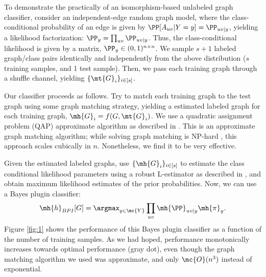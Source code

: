 \documentclass[10pt,journal,cspaper,compsoc]{IEEEtran}
\begin{document}
To demonstrate the practically of an isomorphism-based unlabeled graph classifier, consider an independent-edge random graph model, where the class-conditional probability of an edge is given by $\PP[A_{uv}|Y=y]=\PP_{uv|y}$, yielding a likelihood factorization: $\PP_y=\prod_{uv}\PP_{uv|y}$. Thus, the class-conditional likelihood is given by a matrix, $\PP_y \in (0,1)^{n \times n}$. We sample $s+1$ labeled graph/class pairs identically and independently from the above distribution ($s$ training samples, and 1 test sample). Then, we pass each training graph through a shuffle channel, yielding $\{\mt{G}_i\}_{i \in [s]}$.

Our classifier  proceeds as follows.  Try to match each training graph to the test graph using some graph matching strategy, yielding a estimated labeled graph for each training graph, $\mh{G}_i=f(G,\mt{G}_i)$.  We  use a quadratic assignment problem (QAP) approximate algorithm as described in \cite{VP11QAP}.  This is an approximate graph matching algorithm; while solving graph matching is NP-hard \cite{Conte04}, this approach scales cubically in $n$.  Nonetheless, we find it to be very effective.

Given the estimated labeled graphs, use $\{\mh{G}_i\}_{i \in [s]}$ to estimate the class conditional likelihood parameters using a robust L-estimator as described in \cite{VP11sigsub}, and obtain maximum likelihood estimates of the prior probabilities.  Now, we can use a Bayes plugin classifier:
\begin{align}
	\mh{h}_{BPI}[G]=\argmax_{y\in\mc{Y}} \prod_{uv} \mh{\PP}_{uv|y}\mh{\pi}_y.
\end{align}
Figure \ref{fig:1} shows the performance of this Bayes plugin classifier as a function of the number of training samples.  As we had hoped, performance monotonically increases towards optimal performance (gray dot), even though the graph matching algorithm we used was approximate, and only $\mc{O}(n^3)$ instead of exponential.
\end{document}
